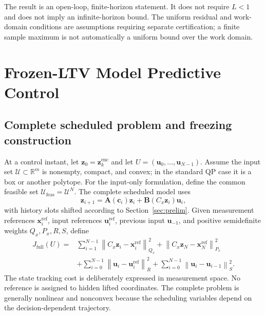 ﻿\documentclass[journal]{IEEEtran}
\newcommand{\vx}{\mathbf{x}}
\newcommand{\vu}{\mathbf{u}}
\newcommand{\vz}{\mathbf{z}}
\newcommand{\vc}{\mathbf{c}}
\newcommand{\mA}{\mathbf{A}}
\newcommand{\mB}{\mathbf{B}}
\newcommand{\R}{\mathbb{R}}
\newcommand{\norm}[1]{\left\lVert #1\right\rVert}
\begin{document}
The result is an open-loop, finite-horizon statement. It does not require $L<1$ and does not imply an infinite-horizon bound. The uniform residual and work-domain conditions are assumptions requiring separate certification; a finite sample maximum is not automatically a uniform bound over the work domain.

\section{Frozen-LTV Model Predictive Control}
\label{sec:control}

\subsection{Complete scheduled problem and freezing construction}

At a control instant, let $\vz_0=\vz_k^{\mathrm{enc}}$ and let $U=(\vu_0,\ldots,\vu_{N-1})$. Assume the input set $\mathcal U\subset\R^m$ is nonempty, compact, and convex; in the standard QP case it is a box or another polytope. For the input-only formulation, define the common feasible set $\mathcal U_{\mathrm{feas}}=\mathcal U^N$. The complete scheduled model uses
\begin{equation}
    \vz_{i+1}=\mA(\vc_i)\vz_i+\mB(C_x\vz_i)\vu_i,
    \label{eq:complete_control_model}
\end{equation}
with history slots shifted according to Section~\ref{sec:prelim}. Given measurement references $\vx_i^{\mathrm{ref}}$, input references $\vu_i^{\mathrm{ref}}$, previous input $\vu_{-1}$, and positive semidefinite weights $Q_x,P_x,R,S$, define
\begin{align}
J_{\mathrm{full}}(U)= {}&\sum_{i=1}^{N-1}\norm{C_x\vz_i-\vx_i^{\mathrm{ref}}}_{Q_x}^2
 +\norm{C_x\vz_N-\vx_N^{\mathrm{ref}}}_{P_x}^2\\
&+\sum_{i=0}^{N-1}\norm{\vu_i-\vu_i^{\mathrm{ref}}}_{R}^2
 +\sum_{i=0}^{N-1}\norm{\vu_i-\vu_{i-1}}_{S}^2.
\label{eq:full_cost}
\end{align}
The state tracking cost is deliberately expressed in measurement space. No reference is assigned to hidden lifted coordinates. The complete problem is generally nonlinear and nonconvex because the scheduling variables depend on the decision-dependent trajectory.
\end{document}
